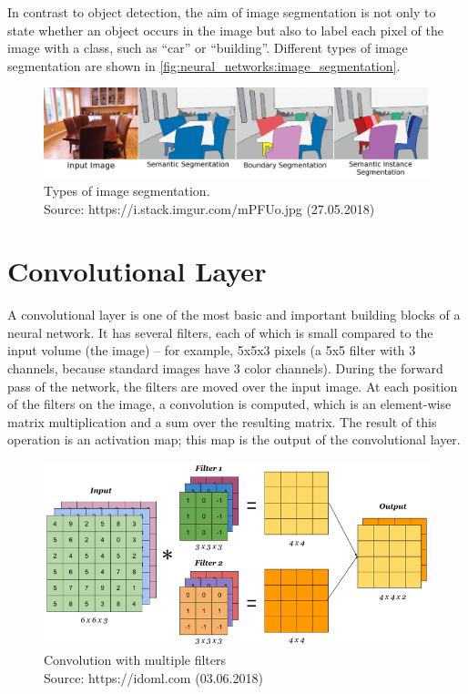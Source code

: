 In contrast to object detection, the aim of image segmentation is not only to state whether an object occurs in the image but also to label each pixel of the image with a class, such as “car” or “building”. Different types of image segmentation are shown in \autoref{fig:neural_networks:image_segmentation}.

\begin{figure}[H]
    \centering
	\includegraphics[width=0.8\linewidth]{chapters/neural_networks/images/segmentation.jpg}
	\caption{Types of image segmentation.\\ Source: https://i.stack.imgur.com/mPFUo.jpg (27.05.2018)}
	\label{fig:neural_networks:image_segmentation}
\end{figure}

\section{Convolutional Layer}
A convolutional layer is one of the most basic and important building blocks of a neural network. It has several filters, each of which is small compared to the input volume (the image) – for example, 5x5x3 pixels (a 5x5 filter with 3 channels, because standard images have 3 color channels). During the forward pass of the network, the filters are moved over the input image. At each position of the filters on the image, a convolution is computed, which is an element-wise matrix multiplication and a sum over the resulting matrix. The result of this operation is an activation map; this map is the output of the convolutional layer.

\begin{figure}[H]
    \centering
	\includegraphics[width=0.8\linewidth]{chapters/neural_networks/images/convolution-with-multiple-filters.png}
	\caption{Convolution with multiple filters\\ Source: https://idoml.com (03.06.2018)}
	\label{fig:neural_networks:convolution_with_multiple_filters}
\end{figure}

